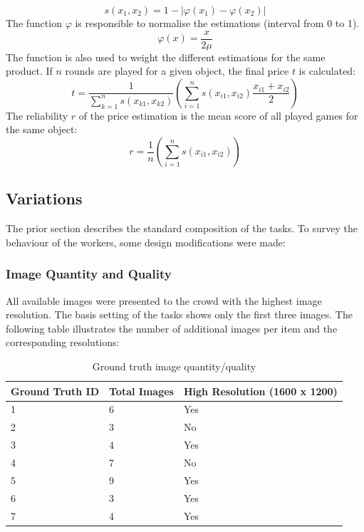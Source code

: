 \begin{equation}
s(x_1,x_2) = 1 - |\varphi(x_1) - \varphi(x_2)|
\end{equation}
The function \( \varphi \) is responsible to normalise the estimations (interval from 0 to 1).
\begin{equation}
\varphi(x) = \frac{x}{2\mu}
\end{equation}
The function is also used to weight the different estimations for the same product. If \( n \) rounds are played for a given object, the final price \( t \) is calculated:
\begin{equation}
t = \frac{1}{\sum_{k=1}^{n} s(x_{k1},x_{k2})}\left(\sum_{i=1}^{n} s(x_{i1},x_{i2})\frac{x_{i1}+x_{i2}}{2}\right)
\end{equation}
The reliability \( r \) of the price estimation is the mean score of all played games for the same object:
\begin{equation}
r = \frac{1}{n}\left(\sum_{i=1}^{n} s(x_{i1},x_{i2})\right)
\end{equation}

\subsection{Variations}
The prior section describes the standard composition of the tasks. To survey the behaviour of the workers, some design modifications were made: 
\subsubsection{Image Quantity and Quality}

All available images were presented to the crowd with the highest image resolution. The basis setting of the tasks shows only the first three images. The following table illustrates the number of additional images per item and the corresponding resolutions: 
\begin{table}[h!]
	\begin{center}
	\begin{tabular}{| p{4.33cm} | p{4.33cm} | p{4.33cm} |}
		\hline
		Ground Truth ID & Total Images & High Resolution (1600 x 1200) \\
		\hline
		1 & 6 & Yes \\
		\hline
		2 & 3 & No \\
		\hline
		3 & 4 & Yes \\
		\hline
		4 & 7 & No \\
		\hline
		5 & 9 & Yes \\
		\hline
		6 & 3 & Yes \\
		\hline
		7 & 4 & Yes \\
		\hline
	\end{tabular}
	\end{center}
	\caption{Ground truth image quantity/quality}
\end{table}
